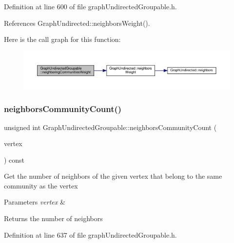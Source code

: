 Definition at line 600 of file graph\+Undirected\+Groupable.\+h.



References Graph\+Undirected\+::neighbors\+Weight().

Here is the call graph for this function\+:
\nopagebreak
\begin{figure}[H]
\begin{center}
\leavevmode
\includegraphics[width=350pt]{classGraphUndirectedGroupable_a29f2ad12ef73c9f0febea63c43b1619b_cgraph}
\end{center}
\end{figure}
\mbox{\label{classGraphUndirectedGroupable_ae5d9459c76d6104345547eaa3e79a088}} 
\subsubsection{\texorpdfstring{neighbors\+Community\+Count()}{neighborsCommunityCount()}}
{\footnotesize\ttfamily unsigned int Graph\+Undirected\+Groupable\+::neighbors\+Community\+Count (\begin{DoxyParamCaption}\item[{const \hyperlink{edge_8h_a5fbd20c46956d479cb10afc9855223f6}{type\+Vertex} \&}]{vertex }\end{DoxyParamCaption}) const\hspace{0.3cm}{\ttfamily [inline]}}

Get the number of neighbors of the given vertex that belong to the same community as the vertex


\begin{DoxyParams}{Parameters}
{\em vertex} & \\
\hline
\end{DoxyParams}
\begin{DoxyReturn}{Returns}
the number of neighbors 
\end{DoxyReturn}


Definition at line 637 of file graph\+Undirected\+Groupable.\+h.



